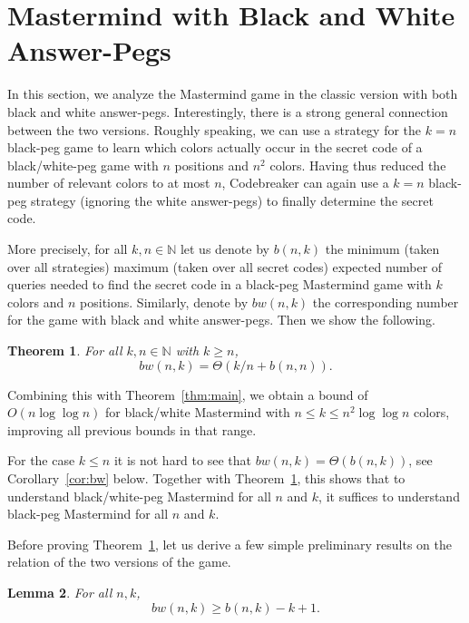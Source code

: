 \documentclass[english,a4paper,11pt]{article}
\newcommand{\N}{{\mathbb{N}}}
\newcommand{\comment}[1]{{\bf [#1]}}
\newcommand{\BD}[1]{\comment{\textcolor{blue}{BD: #1}}}
\newtheorem{theorem}{Theorem}
\newtheorem{lemma}[theorem]{Lemma}
\begin{document}
{\section{Mastermind with Black and White Answer-Pegs} \label{sec:black-and-white}


In this section, we analyze the Mastermind game in the classic version with both black and white answer-pegs. Interestingly, there is a strong general connection between the two versions. Roughly speaking, we can use a strategy for the $k = n$ black-peg game to learn which colors actually occur in the secret code of a black/white-peg game with $n$ positions and $n^2$ colors. Having thus reduced the number of relevant colors to at most $n$, Codebreaker can again use a $k = n$ black-peg strategy (ignoring the white answer-pegs) to finally determine the secret code. 

More precisely, for all $k, n \in \N$ let us denote by $b(n,k)$ the minimum (taken over all strategies) maximum (taken over all secret codes) expected number of queries needed to find the secret code in a black-peg Mastermind game with $k$ colors and $n$ positions. Similarly, denote by $bw(n,k)$ the corresponding number for the game with black and white answer-pegs. Then we show the following.

\begin{theorem}\label{thmbw}
  For all $k, n \in \N$ with $k \ge n$, \[bw(n,k) = \Theta(k/n + b(n,n)).\]
\end{theorem}

Combining this with Theorem~\ref{thm:main}, we obtain a bound of $O(n\log\log n)$ for black/white Mastermind with $n\leq k \leq n^2\log\log n$ colors, improving all previous bounds in that range.

For the case $k \leq n$ it is not hard to see that $bw(n,k) = \Theta(b(n,k))$, see Corollary~\ref{cor:bw} below. Together with Theorem~\ref{thmbw}, this shows that to understand black/white-peg Mastermind for all $n$ and $k$, it suffices to understand black-peg Mastermind for all $n$ and $k$.

Before proving Theorem~\ref{thmbw}, let us derive a few simple preliminary results on the relation of the two versions of the game.

\begin{lemma}\label{lem:bw}
  For all $n, k$, \[bw(n,k) \ge b(n,k) - k + 1.\]
\end{lemma}

}
\end{document}

